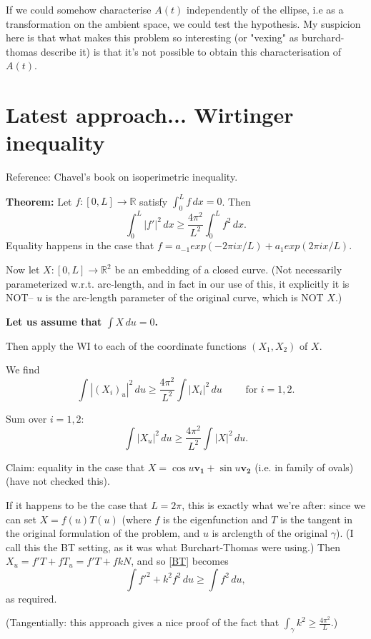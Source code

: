 \documentclass{amsart}
\begin{document}
If we could somehow characterise \(A(t)\) independently of the ellipse, i.e as a transformation on the ambient space, we could test the hypothesis. My suspicion here is that what makes this problem so interesting (or "vexing" as burchard-thomas describe it) is that it's not possible to obtain this characterisation of \(A(t)\).

\section*{Latest approach... Wirtinger inequality}

Reference:  Chavel's book on isoperimetric inequality.   

\bigskip
\textbf{Theorem:} Let $f:[0,L]\rightarrow \mathbb{R}$ satisfy $\int_0^L f\,dx=0$.   Then 
\[\int_0^L |f'|^2 \,dx\ge \frac{4\pi^2}{L^2}\int_0^L f^2\,dx.\tag{WI}\]
Equality happens in the case that $f=a_{-1}exp(-2\pi i x/L)+ a_{1}exp(2\pi i x/L).$

\bigskip

Now let $X:[0,L]\rightarrow \mathbb{R}^2$ be an embedding of a closed curve.  (Not necessarily parameterized w.r.t. arc-length, and in fact in our use of this, it explicitly it is NOT-- $u$ is the arc-length parameter of the original curve, which is NOT $X$.)

\textbf{Let us assume that $\int X \,du =0$. }  

Then apply the WI to each of the coordinate functions $(X_1,X_2)$ of $X$.   

We find
\[ \int |(X_i)_u|^2 \,du \ge \frac{4\pi^2}{L^2}\int |X_i|^2\,du  \quad\quad \text{ for }i=1,2.\]

Sum over $i=1,2$: 
\[ \label{BT} \int |X_u|^2 \,du \ge \frac{4\pi^2}{L^2}\int |X|^2\,du .  \tag{BT}\]

Claim: equality in the case that $X=\cos u \mathbf{v_1}+ \sin u \mathbf{v_2}$ (i.e. in family of ovals) (have not checked this).

If it happens to be the case that $L=2\pi$, this is exactly what we're after:  since we can set $X=f(u)T(u)$ (where $f$ is the eigenfunction and $T$ is the tangent in the original formulation of the problem, and $u$ is arclength of the original $\gamma$).  (I call this the BT setting, as it was what Burchart-Thomas were using.)  Then $X_u= f' T+ fT_u= f'T+ fkN$, and so \eqref{BT} becomes
\[ \int f'^2 + k^2 f^2 \,du \ge \int f^2\,du, \]
as required.

(Tangentially:   this approach gives a nice proof of the fact that $\int_\gamma k^2 \ge \frac{4\pi^2}L$.)
\end{document}
